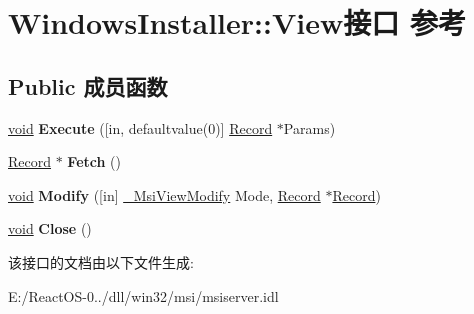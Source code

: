 \hypertarget{interface_windows_installer_1_1_view}{}\section{Windows\+Installer\+:\+:View接口 参考}
\label{interface_windows_installer_1_1_view}
\subsection*{Public 成员函数}
\begin{DoxyCompactItemize}
\item 
\mbox{\label{interface_windows_installer_1_1_view_ab34ee48465e0807e66ca76b2ec3f04f8}} 
\hyperlink{interfacevoid}{void} {\bfseries Execute} (\mbox{[}in, defaultvalue(0)\mbox{]} \hyperlink{interface_windows_installer_1_1_record}{Record} $\ast$Params)
\item 
\mbox{\label{interface_windows_installer_1_1_view_ac6fa77e652ec0883501659be8be1f710}} 
\hyperlink{interface_windows_installer_1_1_record}{Record} $\ast$ {\bfseries Fetch} ()
\item 
\mbox{\label{interface_windows_installer_1_1_view_ac9945c3033be075d17f00d9ac3c690ad}} 
\hyperlink{interfacevoid}{void} {\bfseries Modify} (\mbox{[}in\mbox{]} \hyperlink{interface_windows_installer_1_1enum}{\+\_\+\+Msi\+View\+Modify} Mode, \hyperlink{interface_windows_installer_1_1_record}{Record} $\ast$\hyperlink{interface_windows_installer_1_1_record}{Record})
\item 
\mbox{\label{interface_windows_installer_1_1_view_aade92dcffd7c458cf6be05f46fcc98b8}} 
\hyperlink{interfacevoid}{void} {\bfseries Close} ()
\end{DoxyCompactItemize}


该接口的文档由以下文件生成\+:\begin{DoxyCompactItemize}
\item 
E\+:/\+React\+O\+S-\/0../dll/win32/msi/msiserver.\+idl\end{DoxyCompactItemize}
